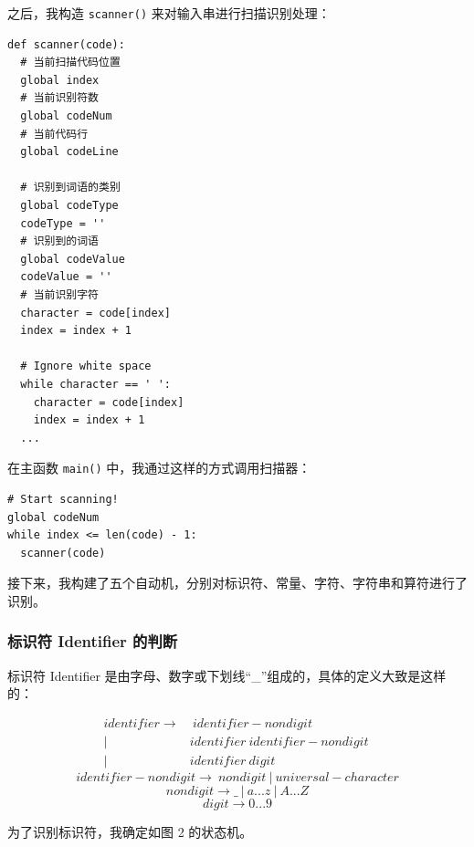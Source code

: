 \documentclass[UTF8]{ctexart}
\begin{document}
之后，我构造 \texttt{scanner()} 来对输入串进行扫描识别处理：

\begin{verbatim}
def scanner(code):
  # 当前扫描代码位置
  global index
  # 当前识别符数
  global codeNum
  # 当前代码行
  global codeLine

  # 识别到词语的类别
  global codeType
  codeType = ''
  # 识别到的词语
  global codeValue
  codeValue = ''
  # 当前识别字符
  character = code[index]
  index = index + 1

  # Ignore white space
  while character == ' ':
    character = code[index]
    index = index + 1
  ...
\end{verbatim}

在主函数 \texttt{main()} 中，我通过这样的方式调用扫描器：

\begin{verbatim}
# Start scanning!
global codeNum
while index <= len(code) - 1:
  scanner(code)
\end{verbatim}

接下来，我构建了五个自动机，分别对标识符、常量、字符、字符串和算符进行了识别。

\subsubsection{标识符 Identifier 的判断}
标识符 Identifier 是由字母、数字或下划线“\_”组成的，具体的定义大致是这样的：

\begin{equation}
\begin{split}
  identifier \rightarrow &\ identifier-nondigit \ \\ |\ & identifier\ identifier-nondigit \ \\ |\ & identifier\ digit
\end{split}
\end{equation}
\begin{equation}
  identifier-nondigit \rightarrow \ nondigit \ |\ universal-character
\end{equation}
\begin{equation}
  nondigit \rightarrow \_ \ |\ a ... z\ |\ A ... Z
\end{equation}
\begin{equation}
  digit \rightarrow 0 ... 9
\end{equation}

为了识别标识符，我确定如图 2 的状态机。
\end{document}
